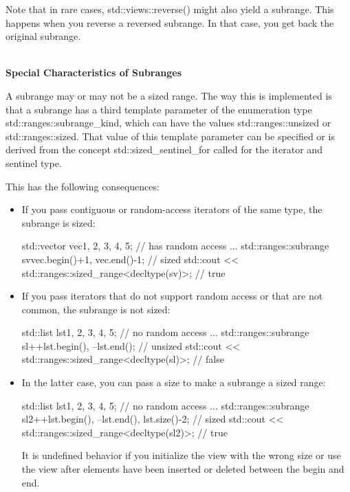 Note that in rare cases, std::views::reverse() might also yield a subrange. This happens when you reverse a reversed subrange. In that case, you get back the original subrange.


\noindent
\hspace*{\fill} \\ %
\textbf{Special Characteristics of Subranges}

A subrange may or may not be a sized range. The way this is implemented is that a subrange has a third template parameter of the enumeration type std::ranges::subrange\_kind, which can have the values std::ranges::unsized or std::ranges::sized. That value of this template parameter can be specified or is derived from the concept std::sized\_sentinel\_for called for the iterator and sentinel type.

This has the following consequences:

\begin{itemize}
\item
If you pass contiguous or random-access iterators of the same type, the subrange is sized:

\begin{cpp}
std::vector vec{1, 2, 3, 4, 5}; // has random access
...
std::ranges::subrange sv{vec.begin()+1, vec.end()-1}; // sized
std::cout << std::ranges::sized_range<decltype(sv)>; // true
\end{cpp}

\item
If you pass iterators that do not support random access or that are not common, the subrange is not sized:

\begin{cpp}
std::list lst{1, 2, 3, 4, 5}; // no random access
...
std::ranges::subrange sl{++lst.begin(), --lst.end()}; // unsized
std::cout << std::ranges::sized_range<decltype(sl)>; // false
\end{cpp}

\item
In the latter case, you can pass a size to make a subrange a sized range:

\begin{cpp}
std::list lst{1, 2, 3, 4, 5}; // no random access
...
std::ranges::subrange sl2{++lst.begin(), --lst.end(), lst.size()-2}; // sized
std::cout << std::ranges::sized_range<decltype(sl2)>; // true
\end{cpp}

It is undefined behavior if you initialize the view with the wrong size or use the view after elements have been inserted or deleted between the begin and end.
\end{itemize}

